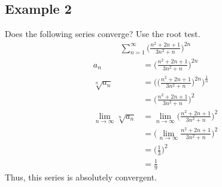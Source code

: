 \documentclass{article}
\theoremstyle{mytheoremstyle}
\theoremstyle{mytheoremstyle}
\theoremstyle{myproblemstyle}
\begin{document}
    \subsection*{Example 2}
    Does the following series converge? Use the root test.
    \begin{align*}
        \sum_{n=1}^{\infty} \Big(\frac{n^2+2n+1}{3n^2+n}\Big)^{2n}
    \end{align*}
    \begin{align*}
        a_n           &= \Big(\frac{n^2+2n+1}{3n^2+n}\Big)^{2n} \\
        \sqrt[n]{a_n} &= \bigg(\Big(\frac{n^2+2n+1}{3n^2+n}\Big)^{2n}\bigg)^{\frac{1}{n}} \\
                      &= \Big(\frac{n^2+2n+1}{3n^2+n}\Big)^{2} \\
        \lim_{n\to \infty} \sqrt[n]{a_n} 
                      &= \lim_{n\to \infty} \Big(\frac{n^2+2n+1}{3n^2+n}\Big)^{2} \\
                      &= \Big(\lim_{n\to \infty} \frac{n^2+2n+1}{3n^2+n}\Big)^{2} \\
                      &= \Big(\frac{1}{3}\Big)^{2} \\
                      &= \frac{1}{9}
    \end{align*}
    Thus, this series is absolutely convergent.
\end{document}
